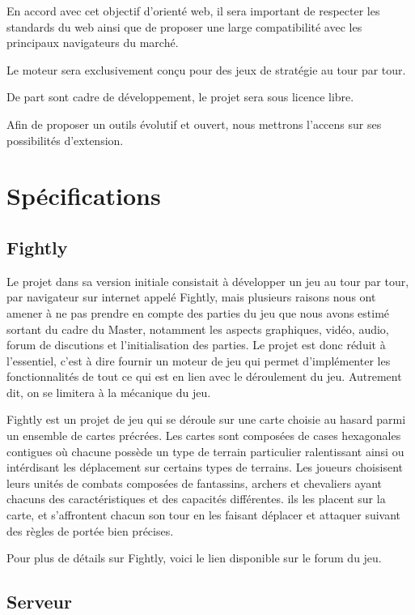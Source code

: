\documentclass[a4paper,10pt]{report}
\begin{document}
En accord avec cet objectif d'orienté web, il sera important de respecter les standards du web ainsi que de proposer une large compatibilité avec les principaux navigateurs du marché.

Le moteur sera exclusivement conçu pour des jeux de stratégie au tour par tour.

De part sont cadre de développement, le projet sera sous licence libre.

Afin de proposer un outils évolutif et ouvert, nous mettrons l'accens sur ses possibilités d'extension.


\section{Spécifications}

\subsection{Fightly}
Le projet dans sa version initiale consistait à développer
un jeu au tour par tour, par navigateur sur internet appelé Fightly, mais plusieurs 
raisons nous ont amener à ne pas prendre en compte des parties du jeu
que nous avons estimé sortant du cadre du Master,
notamment les aspects graphiques, vidéo, audio, forum de discutions et 
l'initialisation des parties. Le projet est donc réduit à l'essentiel, 
c'est à dire fournir un moteur de jeu qui permet d'implémenter les 
fonctionnalités de tout ce qui est en lien avec le déroulement du jeu. 
Autrement dit, on se limitera à la mécanique du jeu.\smallskip \smallskip

Fightly est un projet de jeu qui se déroule sur une carte choisie 
au hasard parmi un ensemble de cartes précrées. Les cartes sont 
composées de cases hexagonales contigues où chacune possède un type de terrain
particulier ralentissant ainsi ou intérdisant les déplacement sur certains 
types de terrains. 
Les joueurs choisisent leurs unités de combats composées de fantassins, 
archers et chevaliers ayant chacuns des caractéristiques et des capacités différentes.
ils les placent sur la carte, et s'affrontent chacun son tour en les faisant 
déplacer et attaquer suivant des règles de portée bien précises.

Pour plus de détails sur Fightly, voici le lien disponible sur le forum du jeu.

\subsection{Serveur}
\end{document}
